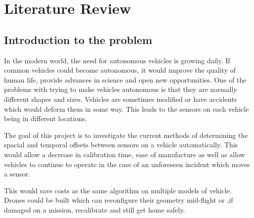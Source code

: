 \documentclass[BCOR13mm,DIV15]{scrartcl}
\begin{document}
\newpage




\section{Literature Review}
\subsection{Introduction to the problem}


In the modern world, the need for autonomous vehicles is growing daily. If common vehicles could become autonomous, it would improve the quality of human life, provide advances in science and open new opportunities. One of the problems with trying to make vehicles autonomous is that they are normally different shapes and sizes. Vehicles are sometimes modified or have accidents which would deform them in some way. This leads to the sensors on each vehicle being in different locations.  

The goal of this project is to investigate the current methods of determining the spacial and temporal offsets between sensors on a vehicle automatically. This would allow a decrease in calibration time, ease of manufacture as well as allow vehicles to continue to operate in the case of an unforeseen incident which moves a sensor.  

This would save costs as the same algorithm on multiple models of vehicle. Drones could be built which can reconfigure their geometry mid-flight or ,if damaged on a mission, recalibrate and still get home safely.





 
\end{document}
